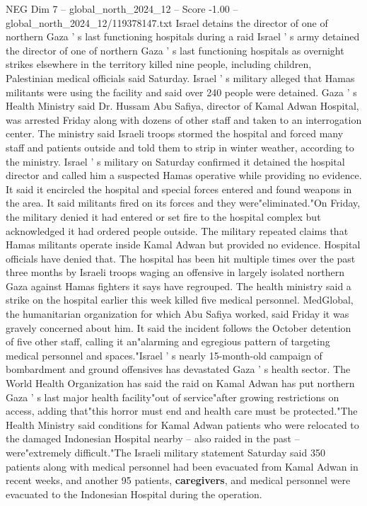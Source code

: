 \begin{textsample}{NEG Dim 7 – global\_north\_2024\_12 – Score -1.00 – global\_north\_2024\_12/119378147.txt}  \label{ex:f7_neg_163}
Israel detains the director of one of northern Gaza ' s last functioning hospitals during a raid Israel ' s army detained the director of one of northern Gaza ' s last functioning hospitals as overnight strikes elsewhere in the territory killed nine people, including children, Palestinian medical officials said Saturday.
Israel ' s military alleged that Hamas militants were using the facility and said over 240 people were detained.
Gaza ' s Health Ministry said Dr.
Hussam Abu Safiya, director of Kamal Adwan Hospital, was arrested Friday along with dozens of other staff and taken to an interrogation center.
The ministry said Israeli troops stormed the hospital and forced many staff and patients outside and told them to strip in winter weather, according to the ministry.
Israel ' s military on Saturday confirmed it detained the hospital director and called him a suspected Hamas operative while providing no evidence.
It said it encircled the hospital and special forces entered and found weapons in the area.
It said militants fired on its forces and they were"eliminated."On Friday, the military denied it had entered or set fire to the hospital complex but acknowledged it had ordered people outside.
The military repeated claims that Hamas militants operate inside Kamal Adwan but provided no evidence.
Hospital officials have denied that.
The hospital has been hit multiple times over the past three months by Israeli troops waging an offensive in largely isolated northern Gaza against Hamas fighters it says have regrouped.
The health ministry said a strike on the hospital earlier this week killed five medical personnel.
MedGlobal, the humanitarian organization for which Abu Safiya worked, said Friday it was gravely concerned about him.
It said the incident follows the October detention of five other staff, calling it an"alarming and egregious pattern of targeting medical personnel and spaces."Israel ' s nearly 15-month-old campaign of bombardment and ground offensives has devastated Gaza ' s health sector.
The World Health Organization has said the raid on Kamal Adwan has put northern Gaza ' s last major health facility"out of service"after growing restrictions on access, adding that"this horror must end and health care must be protected."The Health Ministry said conditions for Kamal Adwan patients who were relocated to the damaged Indonesian Hospital nearby -- also raided in the past -- were"extremely difficult."The Israeli military statement Saturday said 350 patients along with medical personnel had been evacuated from Kamal Adwan in recent weeks, and another 95 patients, \textbf{caregivers}, and medical personnel were evacuated to the Indonesian Hospital during the operation.

\end{textsample}
